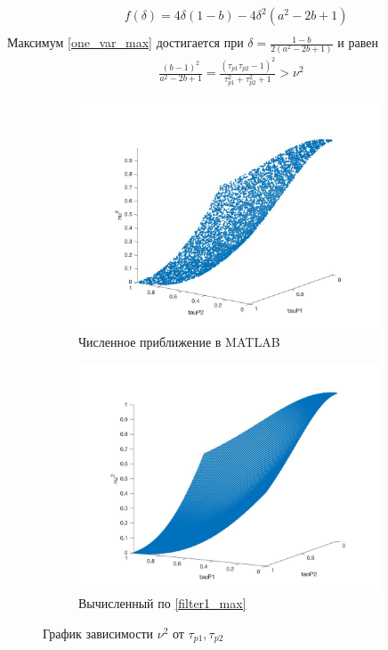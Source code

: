 \documentclass[a4paper,14pt]{extarticle} %
\begin{document}
\begin{equation}\label{one_var_max}
 \begin{aligned}
&f(\delta) = 4\delta(1 - b) - 4\delta^2(a^2 -2b +1)\\
 \end{aligned}
\end{equation} 
Максимум  \eqref{one_var_max} достигается при $\delta = \frac{1-b}{2(a^2 - 2b + 1)}$ и равен
\begin{equation}\label{filter1_max}
 \begin{aligned}
\frac{(b - 1)^2}{a^2 - 2b + 1} = \frac{(\tau_{p1}\tau_{p2} - 1)^2}{\tau_{p1}^2 + \tau_{p2}^2 + 1} > \nu^2
 \end{aligned}
\end{equation} 

\begin{figure}[H]
\begin{subfigure}{.5\textwidth}
  \includegraphics[width=9cm]{images/filter1e.jpg}
  \caption{Численное приближение в MATLAB}
  \label{fig:sub1}
\end{subfigure}%
\begin{subfigure}{.5\textwidth}
\includegraphics[width=9cm]{images/filter1_1.jpg}
  \caption{Вычисленный по \eqref{filter1_max}}
  \label{fig:sub2}
\end{subfigure}
\caption{График зависимости $\nu^2$ от $\tau_{p1}, \tau_{p2}$}
\label{fig:filter1_fig}
\end{figure}
\end{document}
